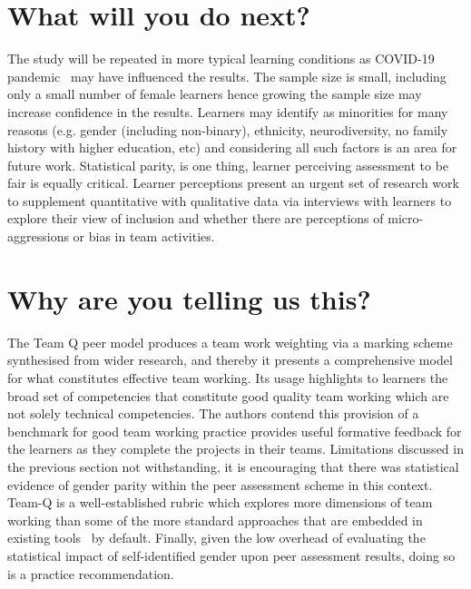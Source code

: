 \documentclass[sigconf, anonymous=false]{acmart}
\begin{document}
\section{What will you do next?}
The study will be repeated in more typical learning conditions as COVID-19 pandemic~\cite{crick-et-al:ukicer2020} may have influenced the results. The sample size is small, including only a small number of female learners hence growing the sample size may increase confidence in the results. Learners may identify as minorities for many reasons (e.g. gender (including non-binary), ethnicity, neurodiversity, no family history with higher education, etc) and considering all such factors is an area for future work. Statistical parity, is one thing, learner perceiving assessment to be fair is equally critical. Learner perceptions present an urgent set of research work to supplement quantitative with qualitative data via interviews with learners to explore their view of inclusion and whether there are perceptions of micro-aggressions or bias in team activities.

\section{Why are you telling us this?}
The Team Q peer model produces a team work weighting via a marking scheme synthesised from wider research, and thereby it presents a
comprehensive model for what constitutes effective team working. Its usage highlights to learners the broad set of competencies that constitute good quality team working which are not solely technical competencies. The authors contend this provision of a benchmark for good team working practice provides useful formative feedback for the learners as they complete the projects in
their teams.
Limitations discussed in the previous section not withstanding, it is encouraging that there was statistical evidence of gender parity within the
peer assessment scheme in this context. Team-Q is a well-established
rubric which explores more dimensions of team working than some of the
more standard approaches that are embedded in existing
tools~\cite{WebPA,BuddyCheck,SparkPlus} by default. Finally, given the low overhead of evaluating the statistical impact of self-identified gender upon peer assessment results, doing so is a practice recommendation.



\end{document}
